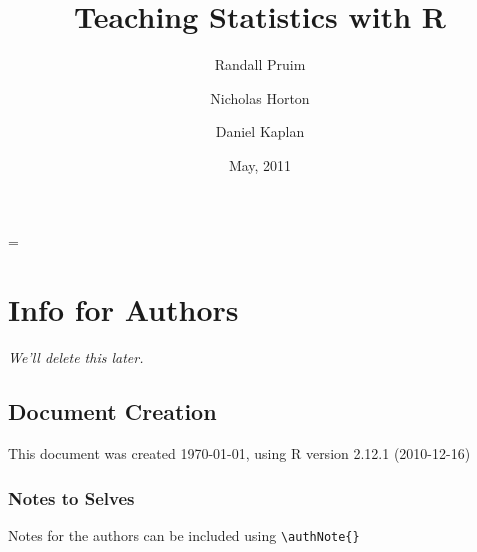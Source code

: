 \documentclass[twoside]{report}
\title{Teaching Statistics with R}
\author{
Randall Pruim
\and
Nicholas Horton 
\and 
Daniel Kaplan 
}
\date{May, 2011}
\begin{document}
\newif\ifhweave
\ifdef{\hlcomment}{\hweavetrue}{\hweavefalse}
\ifhweave
\renewenvironment{Hchunk}%
{%
\vspace{0.5em}\noindent\begin{lrbox}{\highlightbox}%
\begin{minipage}[b]{\Rwidth}%
}%
{%
\end{minipage}%
\end{lrbox}%
\fcolorbox{highlightBg}{highlightBg}{\usebox{\highlightbox}}%
\vspace{0.5em}}%

\renewcommand{\hlcomment}[1]{\textcolor[rgb]{0.4,0.4,0.3}{#1}}%
\fi
\Rwidth=\textwidth

\parindent=0pt
\parskip=3mm





\maketitle

\tableofcontents

\chapter*{Info for Authors}

\begin{center}
\it
We'll delete this later.
\end{center}

\section*{Document Creation}


This document was created
\today, using 
R version 2.12.1 (2010-12-16) 

\subsection*{Notes to Selves}

Notes for the authors can be included using \verb!\authNote{}!
\end{document}
